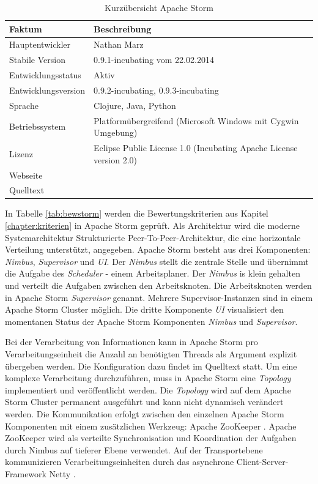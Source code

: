 \begin{table}[htbp]
	\centering
		\begin{tabular}{@{}ll@{}} \toprule
			\textbf{Faktum} & \textbf{Beschreibung} \\ \midrule
			Hauptentwickler & Nathan Marz \\
			Stabile Version & 0.9.1-incubating vom 22.02.2014 \\ 
			Entwicklungsstatus &  Aktiv \\
			Entwicklungsversion & 0.9.2-incubating, 0.9.3-incubating \\
			Sprache & Clojure, Java, Python \\
			Betriebssystem & Platformübergreifend (Microsoft Windows mit Cygwin Umgebung) \\
			Lizenz & Eclipse Public License 1.0 (Incubating Apache License version 2.0) \\
			Webseite &  \citeint{storm:home} \\
			Quelltext & \citeint{storm:GitHubApacheMirror} \\			
			\bottomrule			
		\end{tabular}
	\caption{Kurzübersicht Apache Storm}
	\label{tab:vorstorm}
\end{table}

In Tabelle \ref{tab:bewstorm} werden die Bewertungskriterien aus Kapitel \ref{chapter:kriterien} in Apache Storm geprüft. Als Architektur wird die moderne Systemarchitektur Strukturierte Peer-To-Peer-Architektur, die eine horizontale Verteilung unterstützt, angegeben. Apache Storm besteht aus drei Komponenten: \textit{Nimbus}, \textit{Supervisor} und \textit{UI}. Der \textit{Nimbus} stellt die zentrale Stelle und übernimmt die Aufgabe des \textit{Scheduler} - einem Arbeitsplaner. Der \textit{Nimbus} is klein gehalten und verteilt die Aufgaben zwischen den Arbeitsknoten. Die Arbeitsknoten werden in Apache Storm \textit{Supervisor} genannt. Mehrere Supervisor-Instanzen sind in einem Apache Storm Cluster möglich. Die dritte Komponente \textit{UI} visualisiert den momentanen Status der Apache Storm Komponenten \textit{Nimbus} und \textit{Supervisor}. 

Bei der Verarbeitung von Informationen kann in Apache Storm pro Verarbeitungseinheit die Anzahl an benötigten Threads als Argument explizit übergeben werden. Die Konfiguration dazu findet im Quelltext statt. Um eine komplexe Verarbeitung durchzuführen, muss in Apache Storm eine \textit{Topology} implementiert und veröffentlicht werden. Die \textit{Topology} wird auf dem Apache Storm Cluster permanent ausgeführt und kann nicht dynamisch verändert werden. Die Kommunikation erfolgt zwischen den einzelnen Apache Storm Komponenten mit einem zusätzlichen Werkzeug: Apache ZooKeeper . Apache ZooKeeper wird als verteilte Synchronisation und Koordination der Aufgaben durch Nimbus auf tieferer Ebene verwendet. Auf der Transportebene kommunizieren Verarbeitungseinheiten durch das asynchrone Client-Server-Framework Netty .

